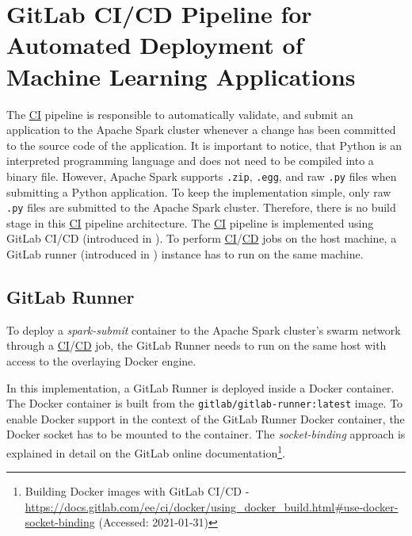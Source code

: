 \section{GitLab CI/CD Pipeline for Automated Deployment of Machine Learning Applications}
\label{sec:06_pipeline}
%
The \hyperlink{abbr:ci}{CI} pipeline is responsible to automatically validate, and submit an application to the Apache Spark cluster whenever a change has been committed to the source code of the application.
It is important to notice, that Python is an interpreted programming language and does not need to be compiled into a binary file. However, Apache Spark supports \texttt{.zip}, \texttt{.egg}, and raw \texttt{.py} files when submitting a Python application. To keep the implementation simple, only raw \texttt{.py} files are submitted to the Apache Spark cluster. Therefore, there is no build stage in this \hyperlink{abbr:ci}{CI} pipeline architecture.
%
The \hyperlink{abbr:ci}{CI} pipeline is implemented using GitLab CI/CD (introduced in ).
%
To perform \hyperlink{abbr:ci}{CI}/\hyperlink{abbr:cd}{CD} jobs on the host machine, a GitLab runner (introduced in ) instance has to run on the same machine.


\subsection{GitLab Runner}
\label{subsec:06_pipeline_runner}
To deploy a \textit{spark-submit} container to the Apache Spark cluster's swarm network through a \hyperlink{abbr:ci}{CI}/\hyperlink{abbr:cd}{CD} job, the GitLab Runner needs to run on the same host with access to the overlaying Docker engine.


In this implementation, a GitLab Runner is deployed inside a Docker container.
The Docker container is built from the \texttt{gitlab/gitlab-runner:latest} image.
To enable Docker support in the context of the GitLab Runner Docker container, the Docker socket has to be mounted to the container. The \textit{socket-binding} approach is explained in detail on the GitLab online documentation\footnote{Building Docker images with GitLab CI/CD  - \url{https://docs.gitlab.com/ee/ci/docker/using_docker_build.html\#use-docker-socket-binding} (Accessed: 2021-01-31)}.


